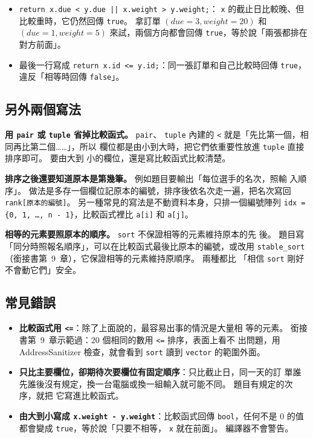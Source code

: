 \begin{itemize}
\item \texttt{return x.due < y.due || x.weight > y.weight;}：
\texttt{x} 的截止日比較晚、但比較重時，它仍然回傳 \texttt{true}。 拿訂單
$(due = 3, weight = 20)$ 和 $(due = 1, weight = 5)$ 來試，兩個方向都會回傳
\texttt{true}，等於說「兩張都排在對方前面」。
\item 最後一行寫成 \texttt{return x.id <= y.id;}：同一張訂單和自己比較時回傳
\texttt{true}，違反「相等時回傳 \texttt{false}」。
\end{itemize}

\subsection{另外兩個寫法}

\textbf{用 \texttt{pair} 或 \texttt{tuple} 省掉比較函式。} \texttt{pair}、
\texttt{tuple} 內建的 \texttt{<} 就是「先比第一個，相同再比第二個……」，所以
欄位都是由小到大時，把它們依重要性放進 \texttt{tuple} 直接排序即可。 要由大到
小的欄位，還是寫比較函式比較清楚。

\textbf{排序之後還要知道原本是第幾筆。} 例如題目要輸出「每位選手的名次，照輸
入順序」。 做法是多存一個欄位記原本的編號，排序後依名次走一遍，把名次寫回
\texttt{rank[原本的編號]}。 另一種常見的寫法是不動資料本身，只排一個編號陣列
\texttt{idx = \{0, 1, \ldots, n - 1\}}，比較函式裡比 \texttt{a[i]} 和
\texttt{a[j]}。

\textbf{相等的元素要照原本的順序。} \texttt{sort} 不保證相等的元素維持原本的先
後。 題目寫「同分時照報名順序」，可以在比較函式最後比原本的編號，或改用
\texttt{stable\_sort}（銜接書第~9~章），它保證相等的元素維持原順序。 兩種都比
「相信 \texttt{sort} 剛好不會動它們」安全。

\subsection{常見錯誤}

\begin{itemize}
\item \textbf{比較函式用 \texttt{<=}}：除了上面說的，最容易出事的情況是大量相
等的元素。 銜接書第~9~章示範過：$20$ 個相同的數用 \texttt{<=} 排序，表面上看不
出問題，用 AddressSanitizer 檢查，就會看到 \texttt{sort} 讀到
\texttt{vector} 的範圍外面。
\item \textbf{只比主要欄位，卻期待次要欄位有固定順序}：只比截止日，同一天的訂
單誰先誰後沒有規定，換一台電腦或換一組輸入就可能不同。 題目有規定的次序，就把
它寫進比較函式。
\item \textbf{由大到小寫成 \texttt{x.weight - y.weight}}：比較函式回傳
\texttt{bool}，任何不是 $0$ 的值都會變成 \texttt{true}，等於說「只要不相等，
\texttt{x} 就在前面」。 編譯器不會警告。
\end{itemize}

